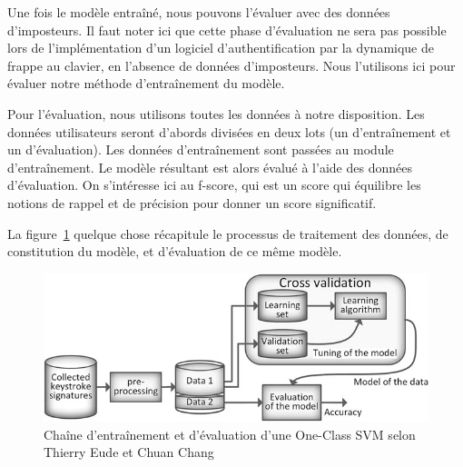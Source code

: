 Une fois le modèle entraîné, nous pouvons l'évaluer avec des données d'imposteurs. Il faut noter ici que cette phase d'évaluation ne sera pas possible lors de l'implémentation d'un logiciel d'authentification par la dynamique de frappe au clavier, en l'absence de données d'imposteurs. Nous l'utilisons ici pour évaluer notre méthode d'entraînement du modèle.

Pour l'évaluation, nous utilisons toutes les données à notre disposition. Les données utilisateurs seront d'abords divisées en deux lots (un d'entraînement et un d'évaluation). Les données d'entraînement sont passées au module d'entraînement. Le modèle résultant est alors évalué à l'aide des données d'évaluation. On s'intéresse ici au f-score, qui est un score qui équilibre les notions de rappel et de précision pour donner un score significatif.

La figure~\ref{ocsvm} quelque chose récapitule le processus de traitement des données, de constitution du modèle, et d'évaluation de ce même modèle.

\begin{figure}[]
    \centering
    \includegraphics[width=\linewidth]{res/ocsvm.png}
    \caption{Chaîne d'entraînement et d'évaluation d'une One-Class SVM selon Thierry Eude et Chuan Chang\cite{doi:10.1111/coin.12122}}
    \label{ocsvm}
\end{figure}
